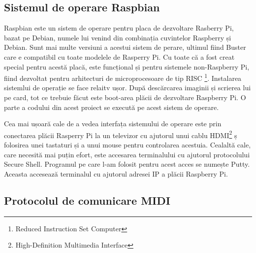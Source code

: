 \documentclass[../IoMusT.tex]{subfiles}
\begin{document}
\subsection{Sistemul de operare Raspbian}
Raspbian este un sistem de operare pentru placa de dezvoltare Rasberry Pi, bazat pe Debian, numele lui venind din combinația cuvintelor Raspberry și Debian. Sunt mai multe versiuni a acestui sistem de perare, ultimul fiind Buster care e compatibil cu toate modelele de Rasperry Pi. Cu toate că a fost creat special pentru acestă placă, este funcțional și pentru sistemele non-Raspberry Pi, fiind dezvoltat pentru arhitecturi de microprocesoare de tip RISC \footnote{Reduced Instruction Set Computer}. Instalarea sistemlui de operație se face relaitv ușor. După descărcarea imaginii și scrierea lui pe card, tot ce trebuie făcut este boot-area plăcii de dezvoltare Raspberry Pi. O parte a codului din acest proiect se execută pe acest sistem de operare.
\\
\par Cea mai ușoară cale de a vedea interfața sistemului de operare este prin conectarea plăcii Rasperry Pi la un televizor cu ajutorul unui cablu HDMI\footnote{High-Definition Multimedia Interface} ș folosirea unei tastaturi și a unui mouse pentru controlarea acestuia. Cealaltă cale, care necesită mai puțin efort, este accesarea terminalului cu ajutorul protocolului Secure Shell. Programul pe care l-am folosit pentru acest acces se numește Putty. Aceasta accesează terminalul cu ajutorul adresei IP a plăcii Raspberry Pi.
\\
\subsection{Protocolul de comunicare MIDI}
\end{document}
